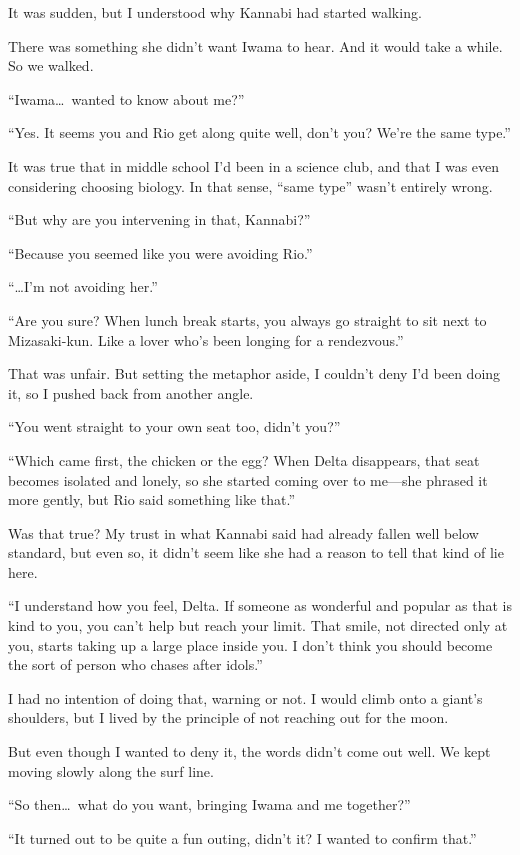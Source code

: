 \documentclass[
    a4paper,
    12pt,
    twoside,
    openany,
    UTF8,
    fontset=windows
]{ctexbook}
\begin{document}
It was sudden, but I understood why Kannabi had started walking.

There was something she didn't want Iwama to hear. And it would take a while. So we walked.

``Iwama\dots\ wanted to know about me?''

``Yes. It seems you and Rio get along quite well, don't you? We're the same type.''

It was true that in middle school I'd been in a science club, and that I was even considering choosing biology. In that sense, ``same type'' wasn't entirely wrong.

``But why are you intervening in that, Kannabi?''

``Because you seemed like you were avoiding Rio.''

``\dots I'm not avoiding her.''

``Are you sure? When lunch break starts, you always go straight to sit next to Mizasaki-kun. Like a lover who's been longing for a rendezvous.''

That was unfair. But setting the metaphor aside, I couldn't deny I'd been doing it, so I pushed back from another angle.

``You went straight to your own seat too, didn't you?''

``Which came first, the chicken or the egg? When Delta disappears, that seat becomes isolated and lonely, so she started coming over to me---she phrased it more gently, but Rio said something like that.''

Was that true? My trust in what Kannabi said had already fallen well below standard, but even so, it didn't seem like she had a reason to tell that kind of lie here.

``I understand how you feel, Delta. If someone as wonderful and popular as that is kind to you, you can't help but reach your limit. That smile, not directed only at you, starts taking up a large place inside you. I don't think you should become the sort of person who chases after idols.''

I had no intention of doing that, warning or not. I would climb onto a giant's shoulders, but I lived by the principle of not reaching out for the moon.

But even though I wanted to deny it, the words didn't come out well. We kept moving slowly along the surf line.

``So then\dots\ what do you want, bringing Iwama and me together?''

``It turned out to be quite a fun outing, didn't it? I wanted to confirm that.''
\end{document}
